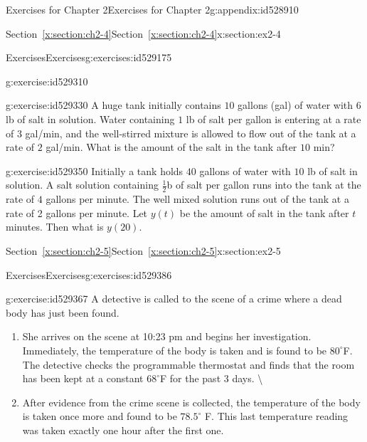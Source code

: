 \documentclass[oneside,10pt,]{book}
\newcommand{\xreffont}{\relax}
\numberwithin{equation}{section}
\numberwithin{equation}{section}
\begin{document}
\begin{appendixptx}{Exercises for Chapter 2}{}{Exercises for Chapter 2}{}{}{g:appendix:id528910}
\begin{sectionptx}{Section~{\xreffont\ref*{x:section:ch2-4}}}{}{Section~{\xreffont\ref*{x:section:ch2-4}}}{}{}{x:section:ex2-4}
\begin{exercises-subsection-numberless}{Exercises}{}{Exercises}{}{}{g:exercises:id529175}
\begin{divisionexercise}{5}{}{}{g:exercise:id529310}
\end{divisionexercise}%
\begin{divisionexercise}{6}{}{}{g:exercise:id529330}%
A huge tank initially contains \(10\) gallons (gal) of water with \(6\) lb of salt in solution. Water containing \(1\) lb of salt per gallon is entering at a rate of \(3\) gal\slash{}min, and the well-stirred mixture is allowed to flow out of the tank at a rate of \(2\) gal\slash{}min. What is the amount of the salt in the tank after \(10\) min?%
\end{divisionexercise}%
\begin{divisionexercise}{7}{}{}{g:exercise:id529350}%
Initially a tank holds \(40\) gallons of water with \(10\) lb of salt in solution. A salt solution containing \(\frac{1}{2}\)b of salt per gallon runs into the tank at the rate of \(4\) gallons per minute. The well mixed solution runs out of the tank at a rate of 2 gallons per minute. Let \(y(t)\) be the amount of salt in the tank after \(t\) minutes. Then what is \(y(20)\).%
\end{divisionexercise}%
\end{exercises-subsection-numberless}
\end{sectionptx}
%
%
\typeout{************************************************}
\typeout{Section C.5 Section~{\xreffont\ref*{x:section:ch2-5}}}
\typeout{************************************************}
%
\begin{sectionptx}{Section~{\xreffont\ref*{x:section:ch2-5}}}{}{Section~{\xreffont\ref*{x:section:ch2-5}}}{}{}{x:section:ex2-5}
%
%
\typeout{************************************************}
\typeout{************************************************}
%
\begin{exercises-subsection-numberless}{Exercises}{}{Exercises}{}{}{g:exercises:id529386}
\begin{divisionexercise}{1}{}{}{g:exercise:id529367}%
A detective is called to the scene of a crime where a dead body has just been found.%
\begin{enumerate}[label=(\alph*)]
\item{}She arrives on the scene at 10:23 pm and begins her investigation. Immediately, the temperature of the body is taken and is found to be \(80^{\circ}\)F. The detective checks the programmable thermostat and finds that the room has been kept at a constant \(68^{\circ}\)F for the past 3 days.%
 \textbackslash{}\item{}After evidence from the crime scene is collected, the temperature of the body is taken once more and found to be \(78.5^{\circ}\) F. This last temperature reading was taken exactly one hour after the first one.%

\end{enumerate}
\end{divisionexercise}
\end{exercises-subsection-numberless}
\end{sectionptx}
\end{appendixptx}
\end{document}
